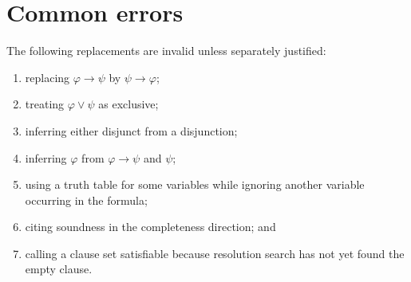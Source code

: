 \section{Common errors}
\label{sec:prop-metatheory-05}

\begin{warning}
The following replacements are invalid unless separately justified:
\begin{enumerate}
  \item replacing \(\varphi\to\psi\) by \(\psi\to\varphi\);
  \item treating \(\varphi\lor\psi\) as exclusive;
  \item inferring either disjunct from a disjunction;
  \item inferring \(\varphi\) from \(\varphi\to\psi\) and \(\psi\);
  \item using a truth table for some variables while ignoring another variable
        occurring in the formula;
  \item citing soundness in the completeness direction; and
  \item calling a clause set satisfiable because resolution search has not yet
        found the empty clause.
\end{enumerate}
\end{warning}

